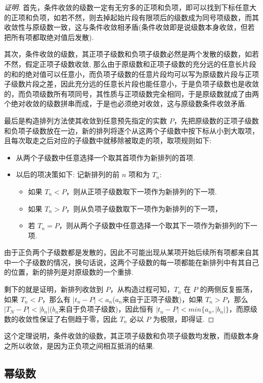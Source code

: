 \begin{proof}[证明]
 首先，条件收敛的级数一定有无穷多的正项和负项，即可以找到下标任意大的正项和负项，如若不然，则去掉起始片段有限项后的级数成为同号项级数，而其收敛性与原级数一致，这与条件收敛相矛盾(条件收敛即是说级数本身收敛，但若把所有项都取绝对值后发散).

 其次，条件收敛的级数，其正项子级数和负项子级数必然是两个发散的级数，如若不然，假定正项子级数收敛, 那么由于原级数和正项子级数的充分远的任意长片段的和的绝对值可以任意小，而负项子级数的任意片段均可以写为原级数片段与正项子级数片段之差，因此充分远的任意长片段也能任意小，于是负项子级数也是收敛的，而负项级数所有项同号，其性质与正项级数完全相同，于是原级数就成了由两个绝对收敛的级数拼串而成，于是也必须绝对收敛，这与原级数条件收敛矛盾.

 最后是构造排列方法使其收敛到任意预先指定的实数 $P$，先把原级数的正项子级数和负项子级数放在一边，新的排列将逐个从这两个子级数中按下标从小到大取项，且每次取走之后对应的子级数中就移除被取走的项，取项规则如下:
 \begin{itemize}
 \item 从两个子级数中任意选择一个取其首项作为新排列的首项.
 \item 以后的项决策如下: 记新排列的前 $n$ 项和为 $T_n$:
   \begin{itemize}
   \item 如果 $T_n<P$，则从正项子级数取下一项作为新排列的下一项.
   \item 如果 $T_n>P$，则从负项子级数取下一项作为新排列的下一项，
   \item 若 $T_n=P$，则从两个子级数中任意选择一个取其下一项作为新排列的下一项.
   \end{itemize}
 \end{itemize}
 由于正负两个子级数都是发散的，因此不可能出现从某项开始后续所有项都来自其中一个子级数的情况，换句话说，这两个子级数的每一项都能在新排列中有其自己的位置，新的排列是对原级数的一个重排.

 剩下的就是证明，新排列收敛到 $P$，从构造过程可知，$T_n$ 在 $P$ 的两侧反复振荡，如果 $T_n<P$，那么有 $|t_n-P|<a_n$($a_n$来自于正项子级数)，如果 $T_n>P$，那么 $|T_N-P|<|b_n|$($b_n$来自于负项子级数)，因此恒有 $|t_n-P|<min\{a_n,|b_n|\}$，而原级数的收敛性保证了右侧趋于零，因此 $T_n$ 必以 $P$ 为极限，即得证.
\end{proof}

这个定理说明，条件收敛的级数，其正项子级数和负项子级数均发散，而级数本身之所以收敛，是因为正负项之间相互抵消的结果.

\subsection{幂级数}
\label{sec:power-series}

